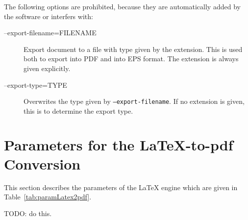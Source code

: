 \noindent
The following options are prohibited, 
because they are automatically added by the software or interfers with: 
%
\begin{description}
\item[{--export-filename=FILENAME}] Export document to a file with type given by the extension. 
This is used both to export into PDF and into EPS format. 
The extension is always given explicitly. 
\item[{--export-type=TYPE}] Overwrites the type given by \texttt{--export-filename}. 
If no extension is given, this is to determine the export type. 
\end{description}


\section{Parameters for the \LaTeX-to-pdf Conversion}%
\label{sec:settingsLatex2pdf}

This section describes the parameters 
of the \LaTeX{} engine 
which are given in Table~\ref{tab:paramLatex2pdf}. 

TODO\@: do this. 


